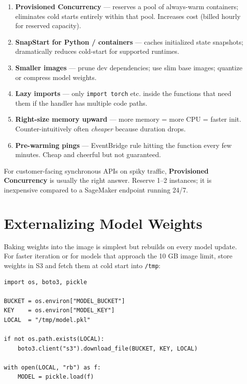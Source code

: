 \documentclass[11pt,a4paper]{article}
\begin{document}
\begin{enumerate}[leftmargin=*]
    \item \textbf{Provisioned Concurrency} --- reserves a pool of always-warm
          containers; eliminates cold starts entirely within that pool.
          Increases cost (billed hourly for reserved capacity).
    \item \textbf{SnapStart for Python / containers} --- caches initialized
          state snapshots; dramatically reduces cold-start for supported
          runtimes.
    \item \textbf{Smaller images} --- prune dev dependencies; use slim base
          images; quantize or compress model weights.
    \item \textbf{Lazy imports} --- only \texttt{import torch} etc. inside
          the functions that need them if the handler has multiple code paths.
    \item \textbf{Right-size memory upward} --- more memory = more CPU = faster
          init. Counter-intuitively often \emph{cheaper} because duration drops.
    \item \textbf{Pre-warming pings} --- EventBridge rule hitting the function
          every few minutes. Cheap and cheerful but not guaranteed.
\end{enumerate}

\begin{tipbox}
For customer-facing synchronous APIs on spiky traffic, \textbf{Provisioned
Concurrency} is usually the right answer. Reserve 1--2 instances; it is
inexpensive compared to a SageMaker endpoint running 24/7.
\end{tipbox}

\section{Externalizing Model Weights}

Baking weights into the image is simplest but rebuilds on every model update.
For faster iteration or for models that approach the 10 GB image limit, store
weights in S3 and fetch them at cold start into \texttt{/tmp}:

\begin{lstlisting}[style=pycode]
import os, boto3, pickle

BUCKET = os.environ["MODEL_BUCKET"]
KEY    = os.environ["MODEL_KEY"]
LOCAL  = "/tmp/model.pkl"

if not os.path.exists(LOCAL):
    boto3.client("s3").download_file(BUCKET, KEY, LOCAL)

with open(LOCAL, "rb") as f:
    MODEL = pickle.load(f)
\end{lstlisting}
\end{document}
